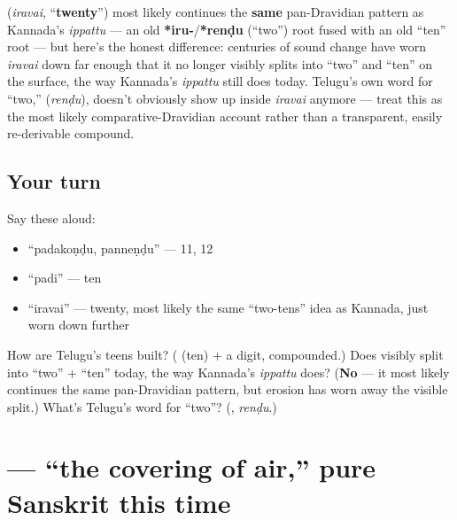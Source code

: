 \begin{cousinweb}
\textbf{} (\emph{iravai}, \textquotedblleft{}\textbf{twenty}\textquotedblright{}) most likely continues the \textbf{same} pan-Dravidian pattern as Kannada's \emph{ippattu} — an old \textbf{*iru-}/\textbf{*renḍu} (\textquotedblleft{}two\textquotedblright{}) root fused with an old \textquotedblleft{}ten\textquotedblright{} root — but here's the honest difference: centuries of sound change have worn \emph{iravai} down far enough that it no longer visibly splits into \textquotedblleft{}two\textquotedblright{} and \textquotedblleft{}ten\textquotedblright{} on the surface, the way Kannada's \emph{ippattu} still does today. Telugu's own word for \textquotedblleft{}two,\textquotedblright{} \textbf{} (\emph{renḍu}), doesn't obviously show up inside \emph{iravai} anymore — treat this as the most likely comparative-Dravidian account rather than a transparent, easily re-derivable compound.
\end{cousinweb}

\subsection*{Your turn}
Say these aloud:

\begin{itemize}
\raggedright
  \item \textquotedblleft{}padakoṇḍu, panneṇḍu\textquotedblright{} — 11, 12
  \item \textquotedblleft{}padi\textquotedblright{} — ten
  \item \textquotedblleft{}iravai\textquotedblright{} — twenty, most likely the same \textquotedblleft{}two-tens\textquotedblright{} idea as Kannada, just worn down further
\end{itemize}

\begin{tcolorbox}[breakable,colback=teal!4,colframe=teal!35!black,title={Before you move on}]
How are Telugu's teens built? (\textbf{} (ten) + a digit, compounded.) Does \textbf{} visibly split into \textquotedblleft{}two\textquotedblright{} + \textquotedblleft{}ten\textquotedblright{} today, the way Kannada's \emph{ippattu} does? (\textbf{No} — it most likely continues the same pan-Dravidian pattern, but erosion has worn away the visible split.) What's Telugu's word for \textquotedblleft{}two\textquotedblright{}? (\textbf{}, \emph{renḍu}.)
\end{tcolorbox}
\section[\texorpdfstring{\te{వాతావరణం} (vātāvaraṇam)}{వాతావరణం (vātāvaraṇam)}]{ — \textquotedblleft{}the covering of air,\textquotedblright{} pure Sanskrit this time}

